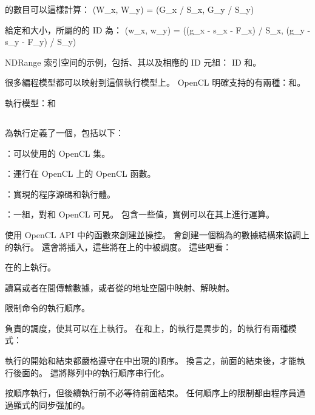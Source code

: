 的數目可以這樣計算：
\startformula
(W_x, W_y) = (G_x / S_x, G_y / S_y)
\stopformula

給定和大小，所屬的的 ID 為：
\startformula
(w_x, w_y) = ((g_x - s_x - F_x) / S_x, (g_y - s_y - F_y) / S_y)
\stopformula

\startbuffer[buffigindexspacecaption]
NDRange 索引空间的示例，包括、其以及相應的 ID 元組： ID 和。
\stopbuffer
{}
{}

很多編程模型都可以映射到這個執行模型上。
OpenCL 明確支持的有兩種：和。

\startbuffer[buftitleemccmdq]
執行模型：和
\stopbuffer
\subsection{\getbuffer[buftitleemccmdq]}

為執行定義了一個，包括以下：
\startigNum
\item {}：可以使用的 OpenCL 集。
\item {}：運行在 OpenCL 上的 OpenCL 函數。
\item {}：實現的程序源碼和執行體。
\item {}：一組，對和 OpenCL 可見。
包含一些值，實例可以在其上進行運算。
\stopigBase

使用 OpenCL API 中的函數來創建並操控。
會創建一個稱為的數據結構來協調上的執行。
還會將插入，這些將在上的中被調度。
這些吧看：
\startigBase
\item {}在的上執行。
\item {}讀寫或者在間傳輸數據，或者從的地址空間中映射、解映射。
\item {}限制命令的執行順序。
\stopigBase

負責的調度，使其可以在上執行。
在和上，的執行是異步的，的執行有兩種模式：
\startigBase
\item {}執行的開始和結束都嚴格遵守在中出現的順序。
換言之，前面的結束後，才能執行後面的。
這將隊列中的執行順序串行化。
\item {}按順序執行，但後續執行前不必等待前面結束。
任何順序上的限制都由程序員通過顯式的同步强加的。
\stopigBase

